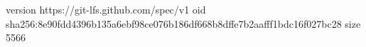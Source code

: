version https://git-lfs.github.com/spec/v1
oid sha256:8e90fdd4396b135a6ebf98ce076b186df668b8dffe7b2aafff1bdc16f027bc28
size 5566
